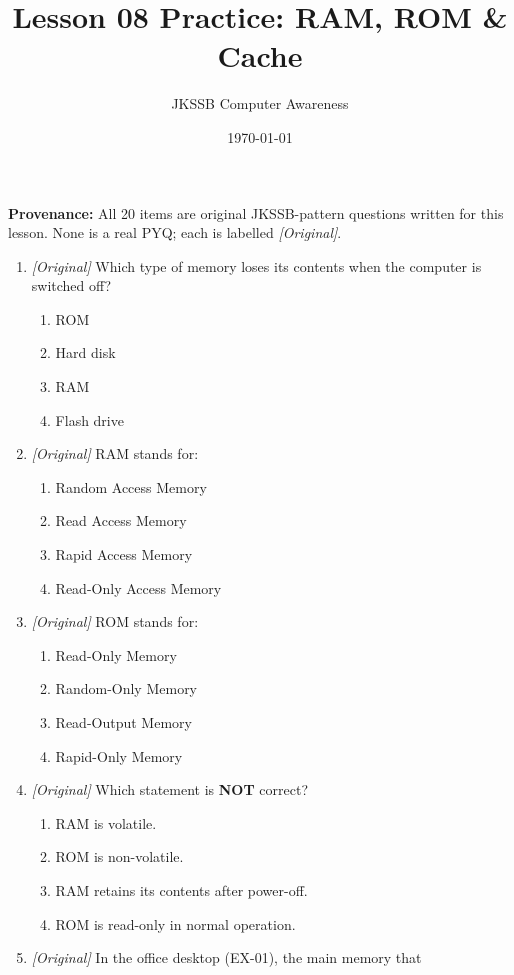 \documentclass[11pt]{article}
\title{Lesson 08 Practice: RAM, ROM \& Cache}
\author{JKSSB Computer Awareness}
\date{\today}
\begin{document}
\maketitle
\noindent\textbf{Provenance:} All 20 items are original JKSSB-pattern
questions written for this lesson. None is a real PYQ; each is labelled
\textit{[Original]}.

\begin{enumerate}[label=\textbf{Q\arabic*.}, leftmargin=*]
\item \textit{[Original]} Which type of memory loses its contents when the
  computer is switched off?
  \begin{enumerate}[label=\Alph*.]
    \item ROM
    \item Hard disk
    \item RAM
    \item Flash drive
  \end{enumerate}
\item \textit{[Original]} RAM stands for:
  \begin{enumerate}[label=\Alph*.]
    \item Random Access Memory
    \item Read Access Memory
    \item Rapid Access Memory
    \item Read-Only Access Memory
  \end{enumerate}
\item \textit{[Original]} ROM stands for:
  \begin{enumerate}[label=\Alph*.]
    \item Read-Only Memory
    \item Random-Only Memory
    \item Read-Output Memory
    \item Rapid-Only Memory
  \end{enumerate}
\item \textit{[Original]} Which statement is \textbf{NOT} correct?
  \begin{enumerate}[label=\Alph*.]
    \item RAM is volatile.
    \item ROM is non-volatile.
    \item RAM retains its contents after power-off.
    \item ROM is read-only in normal operation.
  \end{enumerate}
\item \textit{[Original]} In the office desktop (EX-01), the main memory that

\end{enumerate}
\end{document}
